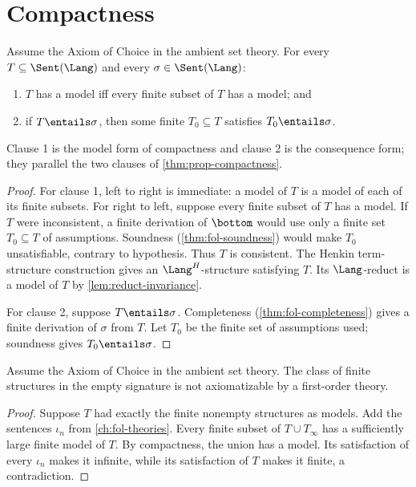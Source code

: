 \section{Compactness}
\label{sec:fol-metatheory-04}

\begin{theorem}
\label{thm:fol-compactness}
Assume the Axiom of Choice in the ambient set theory.  For every
\(T\subseteq\Sent(\Lang)\) and every \(\sigma\in\Sent(\Lang)\):
\begin{enumerate}
  \item \(T\) has a model iff every finite subset of \(T\) has a model;
        and
  \item if \(T\entails\sigma\), then some finite \(T_0\subseteq T\)
        satisfies \(T_0\entails\sigma\).
\end{enumerate}
Clause 1 is the model form of compactness and clause 2 is the consequence
form; they parallel the two clauses of \cref{thm:prop-compactness}.
\end{theorem}
\begin{proof}
For clause 1, left to right is immediate: a model of \(T\) is a model of
each of its finite subsets.  For right to left, suppose every finite
subset of \(T\) has a model.  If \(T\) were inconsistent, a finite
derivation of \(\bottom\) would use only a finite set
\(T_0\subseteq T\) of assumptions.  Soundness (\cref{thm:fol-soundness})
would make \(T_0\) unsatisfiable, contrary to hypothesis.  Thus \(T\) is
consistent.  The Henkin term-structure construction gives an
\(\Lang^H\)-structure satisfying \(T\).  Its \(\Lang\)-reduct is a model
of \(T\) by \cref{lem:reduct-invariance}.

For clause 2, suppose \(T\entails\sigma\).  Completeness
(\cref{thm:fol-completeness}) gives a finite derivation of \(\sigma\)
from \(T\).  Let \(T_0\) be the finite set of assumptions used; soundness
gives \(T_0\entails\sigma\).
\end{proof}

\begin{corollary}
Assume the Axiom of Choice in the ambient set theory.
The class of finite structures in the empty signature is not axiomatizable by
a first-order theory.
\end{corollary}
\begin{proof}
Suppose \(T\) had exactly the finite nonempty structures as models.  Add the
sentences \(\iota_n\) from \cref{ch:fol-theories}.  Every finite subset of
\(T\cup T_\infty\) has a sufficiently large finite model of \(T\).  By
compactness, the union has a model.  Its satisfaction of every \(\iota_n\)
makes it infinite, while its satisfaction of \(T\) makes it finite, a
contradiction.
\end{proof}

